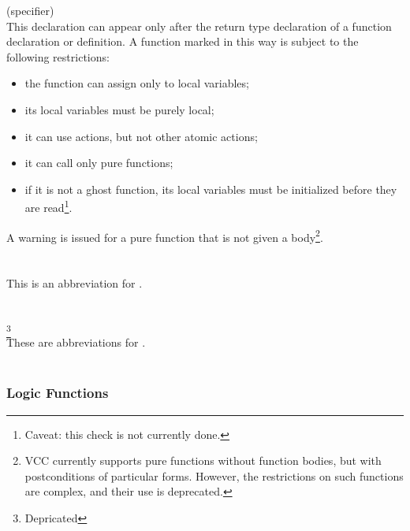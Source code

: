 \documentclass[preprint,nocopyrightspace]{sigplanconf}
\begin{document}
{{{ (specifier)\\
This declaration can appear only after the return type declaration of
a function declaration or definition. A function marked in this way is
subject to the following restrictions:
\begin{itemize}
\item the function can assign only to local variables;
\item its local variables must be purely local;
\item it can use  actions, but not other atomic actions;
\item it can call only pure functions;
\item if it is not a ghost function, its local variables must be
initialized before they are read\footnote{Caveat: this check is not
currently done.}.
\end{itemize}

A warning is issued for a pure function that is not given a
body\footnote{
VCC currently supports pure functions without function
bodies, but with postconditions of particular forms. However, the
restrictions on such functions are complex, and their use is
deprecated.
}.
\\\\
\\
This is an abbreviation for 
.
\\\\
\\
\footnote{Depricated}\\
These are abbreviations for . 
\\\\
\subsubsection{Logic Functions}
}}}
\end{document}
